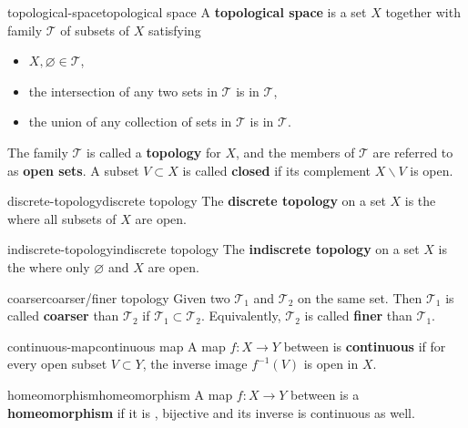 \begin{topic}{topological-space}{topological space}
    A \textbf{topological space} is a set $X$ together with family $\mathcal{T}$ of subsets of $X$ satisfying
    \begin{itemize}
        \item $X, \varnothing \in \mathcal{T}$,
        \item the intersection of any two sets in $\mathcal{T}$ is in $\mathcal{T}$,
        \item the union of any collection of sets in $\mathcal{T}$ is in $\mathcal{T}$.
    \end{itemize}
    The family $\mathcal{T}$ is called a \textbf{topology} for $X$, and the members of $\mathcal{T}$ are referred to as \textbf{open sets}. A subset $V \subset X$ is called \textbf{closed} if its complement $X \backslash V$ is open.
\end{topic}

\begin{topic}{discrete-topology}{discrete topology}
    The \textbf{discrete topology} on a set $X$ is the  where all subsets of $X$ are open.
\end{topic}

\begin{topic}{indiscrete-topology}{indiscrete topology}
    The \textbf{indiscrete topology} on a set $X$ is the  where only $\varnothing$ and $X$ are open.
\end{topic}

\begin{topic}{coarser}{coarser/finer topology}
    Given two  $\mathcal{T}_1$ and $\mathcal{T}_2$ on the same set. Then $\mathcal{T}_1$ is called \textbf{coarser} than $\mathcal{T}_2$ if $\mathcal{T}_1 \subset \mathcal{T}_2$. Equivalently, $\mathcal{T}_2$ is called \textbf{finer} than $\mathcal{T}_1$.
\end{topic}

\begin{topic}{continuous-map}{continuous map}
    A map $f : X \to Y$ between  is \textbf{continuous} if for every open subset $V \subset Y$, the inverse image $f^{-1}(V)$ is open in $X$.
\end{topic}

\begin{topic}{homeomorphism}{homeomorphism}
    A map $f : X \to Y$ between  is a \textbf{homeomorphism} if it is , bijective and its inverse is continuous as well.
\end{topic}

